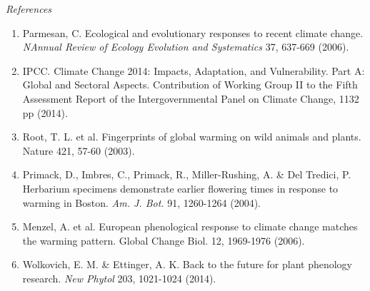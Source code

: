\documentclass[10.95pt,a4paper]{letter}
\begin{document}
\begin{letter}{}
\noindent \emph{References}
\begin{footnotesize}
\begin{enumerate}
\item Parmesan, C. Ecological and evolutionary responses to recent climate change.  \emph{NAnnual Review of Ecology Evolution and Systematics} 37, 637-669 (2006).
\item  IPCC. Climate Change 2014: Impacts, Adaptation, and Vulnerability. Part A: Global and Sectoral Aspects. Contribution of Working Group II to the Fifth Assessment Report of the Intergovernmental Panel on Climate Change, 1132 pp (2014).
\item Root, T. L. et al. Fingerprints of global warming on wild animals and plants. Nature 421, 57-60 (2003).
\item Primack, D., Imbres, C., Primack, R., Miller-Rushing, A. & Del Tredici, P. Herbarium specimens demonstrate earlier flowering times in response to warming in Boston.  \emph{Am. J. Bot.} 91, 1260-1264 (2004).
\item Menzel, A. et al. European phenological response to climate change matches the warming pattern. Global Change Biol. 12, 1969-1976 (2006).
\item Wolkovich, E. M. & Ettinger, A. K. Back to the future for plant phenology research. \emph{New Phytol} 203, 1021-1024 (2014).
\end{enumerate}
\end{footnotesize}



\end{letter}
\end{document}
